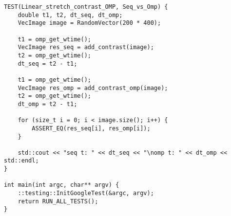 \documentclass{report}
\begin{document}
\begin{lstlisting}
TEST(Linear_stretch_contrast_OMP, Seq_vs_Omp) {
    double t1, t2, dt_seq, dt_omp;
    VecImage image = RandomVector(200 * 400);

    t1 = omp_get_wtime();
    VecImage res_seq = add_contrast(image);
    t2 = omp_get_wtime();
    dt_seq = t2 - t1;

    t1 = omp_get_wtime();
    VecImage res_omp = add_contrast_omp(image);
    t2 = omp_get_wtime();
    dt_omp = t2 - t1;

    for (size_t i = 0; i < image.size(); i++) {
        ASSERT_EQ(res_seq[i], res_omp[i]);
    }

    std::cout << "seq t: " << dt_seq << "\nomp t: " << dt_omp << std::endl;
}

int main(int argc, char** argv) {
    ::testing::InitGoogleTest(&argc, argv);
    return RUN_ALL_TESTS();
}
    \end{lstlisting}
    
\end{document}

